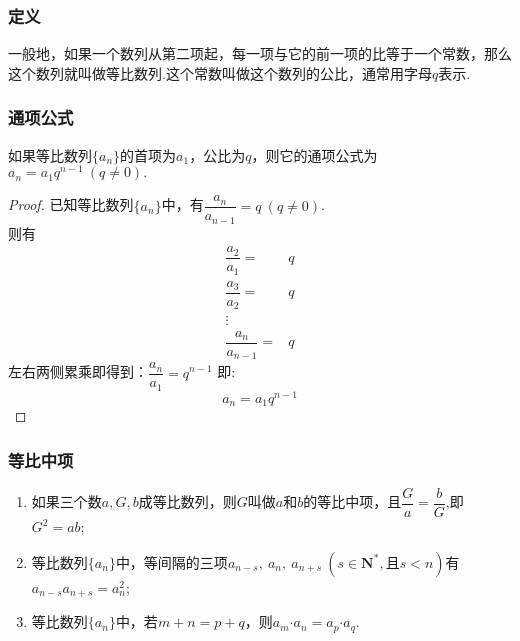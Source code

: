 \documentclass{BHCexam}
\begin{document}
\subsubsection{定义}
一般地，如果一个数列从第二项起，每一项与它的前一项的比等于一个常数，那么这个数列就叫做等比数列.这个常数叫做这个数列的公比，通常用字母$ q $表示.
\subsubsection{通项公式}
如果等比数列$\{a_n\}$的首项为$a_1$，公比为$ q $，则它的通项公式为$ a_n=a_1q^{n-1}~(q\ne0). $
\begin{proof}
已知等比数列$\{a_n\}$中，有$\dfrac{a_n}{a_{n-1}}=q~(q\ne0)$.\\
则有$$ \begin{aligned}
\dfrac{a_2}{a_1}=&q\\
\dfrac{a_3}{a_2}=&q\\
\vdots&\\
\dfrac{a_n}{a_{n-1}}=&q 
\end{aligned}
$$
左右两侧累乘即得到：$\dfrac{a_n}{a_1}=q^{n-1}$
即:$$ a_n=a_1q^{n-1} $$
\end{proof}
\subsubsection{等比中项}
\begin{enumerate}[(1)]
\item 如果三个数$ a,G,b $成等比数列，则$ G $叫做$ a $和$ b $的等比中项，且$ \dfrac{G}{a}=\dfrac{b}{G} $,即$ G^2=ab $;
\item 等比数列$ \{a_n\} $中，等间隔的三项$ a_{n-s},~a_n,~a_{n+s}~(s\in\mathbf{N^*},\text{且} s<n ) $有$ a_{n-s}a_{n+s}=a_n^2 $;
\item 等比数列$ \{a_n\} $中，若$ m+n=p+q $，则$ a_m\bm{\cdot}a_n=a_p\bm{\cdot}a_q $.
\end{enumerate}
\end{document}
